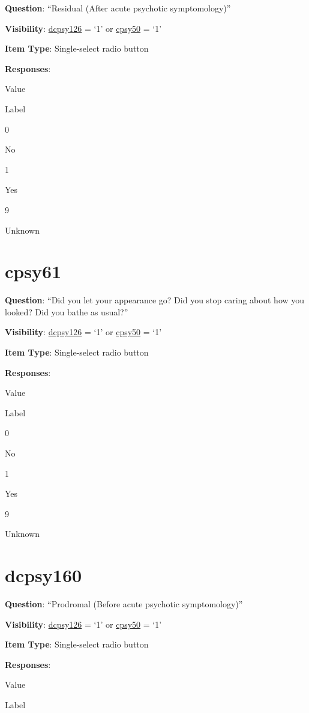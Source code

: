 \documentclass[]{book}
\begin{document}
\textbf{Question}: ``Residual (After acute psychotic symptomology)''

\textbf{Visibility}: \protect\hyperlink{dcpsy126}{dcpsy126} = `1' or \protect\hyperlink{cpsy50}{cpsy50} = `1'

\textbf{Item Type}: Single-select radio button

\textbf{Responses}:

Value

Label

0

No

1

Yes

9

Unknown

\hypertarget{cpsy61}{%
\section{cpsy61}\label{cpsy61}}

\textbf{Question}: ``Did you let your appearance go? Did you stop caring about how you looked? Did you bathe as usual?''

\textbf{Visibility}: \protect\hyperlink{dcpsy126}{dcpsy126} = `1' or \protect\hyperlink{cpsy50}{cpsy50} = `1'

\textbf{Item Type}: Single-select radio button

\textbf{Responses}:

Value

Label

0

No

1

Yes

9

Unknown

\hypertarget{dcpsy160}{%
\section{dcpsy160}\label{dcpsy160}}

\textbf{Question}: ``Prodromal (Before acute psychotic symptomology)''

\textbf{Visibility}: \protect\hyperlink{dcpsy126}{dcpsy126} = `1' or \protect\hyperlink{cpsy50}{cpsy50} = `1'

\textbf{Item Type}: Single-select radio button

\textbf{Responses}:

Value

Label
\end{document}
